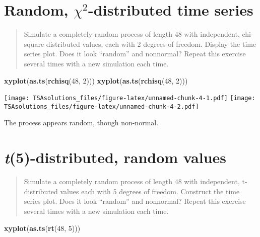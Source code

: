 \documentclass[]{book}
\newenvironment{Shaded}{\begin{snugshade}}{\end{snugshade}}
\newcommand{\KeywordTok}[1]{\textcolor[rgb]{0.13,0.29,0.53}{\textbf{{#1}}}}
\newcommand{\DecValTok}[1]{\textcolor[rgb]{0.00,0.00,0.81}{{#1}}}
\newcommand{\NormalTok}[1]{{#1}}
\begin{document}
\section{\texorpdfstring{Random, \(\chi^2\)-distributed time
series}{Random, \textbackslash{}chi\^{}2-distributed time series}}\label{random-chi2-distributed-time-series}

\begin{quote}
Simulate a completely random process of length 48 with independent,
chi-square distributed values, each with 2 degrees of freedom. Display
the time series plot. Does it look ``random'' and nonnormal? Repeat this
exercise several times with a new simulation each time.
\end{quote}

\begin{Shaded}
\begin{Highlighting}[]
\KeywordTok{xyplot}\NormalTok{(}\KeywordTok{as.ts}\NormalTok{(}\KeywordTok{rchisq}\NormalTok{(}\DecValTok{48}\NormalTok{, }\DecValTok{2}\NormalTok{)))}
\KeywordTok{xyplot}\NormalTok{(}\KeywordTok{as.ts}\NormalTok{(}\KeywordTok{rchisq}\NormalTok{(}\DecValTok{48}\NormalTok{, }\DecValTok{2}\NormalTok{)))}
\end{Highlighting}
\end{Shaded}

\texttt{[image: TSAsolutions\_files/figure-latex/unnamed-chunk-4-1.pdf]}
\texttt{[image: TSAsolutions\_files/figure-latex/unnamed-chunk-4-2.pdf]}

The process appears random, though non-normal.

\section{\texorpdfstring{\emph{t}(5)-distributed, random
values}{t(5)-distributed, random values}}\label{t5-distributed-random-values}

\begin{quote}
Simulate a completely random process of length 48 with independent,
t-distributed values each with 5 degrees of freedom. Construct the time
series plot. Does it look ``random'' and nonnormal? Repeat this exercise
several times with a new simulation each time.
\end{quote}

\begin{Shaded}
\begin{Highlighting}[]
\KeywordTok{xyplot}\NormalTok{(}\KeywordTok{as.ts}\NormalTok{(}\KeywordTok{rt}\NormalTok{(}\DecValTok{48}\NormalTok{, }\DecValTok{5}\NormalTok{)))}
\end{Highlighting}
\end{Shaded}
\end{document}
